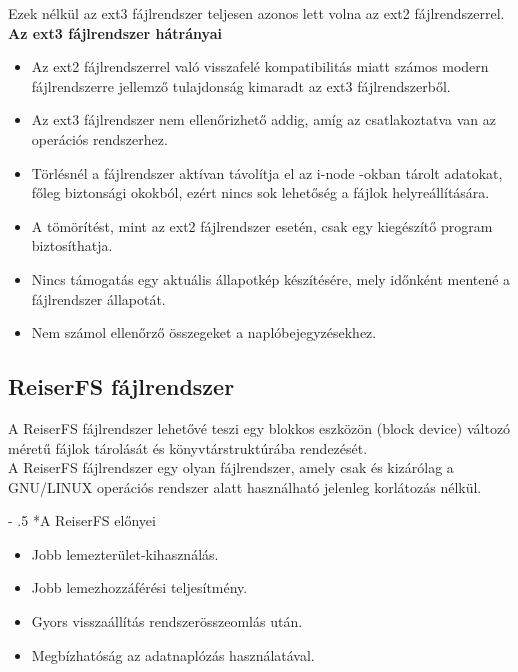 \documentclass[tikz,12pt,margin=0px]{article}
\makeatletter
\renewcommand\paragraph{%
	\@startsection{paragraph}{4}{0mm}%
	{-\baselineskip}%
	{.5\baselineskip}%
	{\normalfont\normalsize\bfseries}}
\makeatother
\begin{document}
    \noindent Ezek nélkül az ext3 fájlrendszer teljesen azonos lett volna az ext2 fájlrendszerrel.\\

    \noindent \textbf{Az ext3 fájlrendszer hátrányai\\}

    \begin{itemize}[topsep=8pt,itemsep=4pt,partopsep=4pt, parsep=4pt]
        \item Az ext2 fájlrendszerrel való visszafelé kompatibilitás miatt számos modern fájlrendszerre jellemző tulajdonság kimaradt az ext3 fájlrendszerből.
        \item Az ext3 fájlrendszer nem ellenőrizhető addig, amíg az csatlakoztatva van az operációs rendszerhez.
        \item Törlésnél a fájlrendszer aktívan távolítja el az i-node -okban tárolt adatokat, főleg biztonsági okokból, ezért nincs sok lehetőség a fájlok helyreállítására.
        \item A tömörítést, mint az ext2 fájlrendszer esetén, csak egy kiegészítő program biztosíthatja.
        \item Nincs támogatás egy aktuális állapotkép készítésére, mely időnként mentené a fájlrendszer állapotát.
        \item Nem számol ellenőrző összegeket a naplóbejegyzésekhez.
    \end{itemize}

	\subsection*{ReiserFS fájlrendszer\\}

    \noindent A ReiserFS fájlrendszer lehetővé teszi egy blokkos eszközön (block device) változó méretű fájlok tárolását és könyvtárstruktúrába rendezését.\\

    \noindent A ReiserFS fájlrendszer egy olyan fájlrendszer, amely csak és kizárólag a GNU/LINUX operációs rendszer alatt használható jelenleg korlátozás nélkül.

    \paragraph*{A ReiserFS előnyei}

    \begin{itemize}[topsep=8pt,itemsep=4pt,partopsep=4pt, parsep=4pt]
        \item Jobb lemezterület-kihasználás.
        \item Jobb lemezhozzáférési teljesítmény.
        \item Gyors visszaállítás rendszerösszeomlás után.
        \item Megbízhatóság az adatnaplózás használatával.
    \end{itemize}
	
\end{document}
